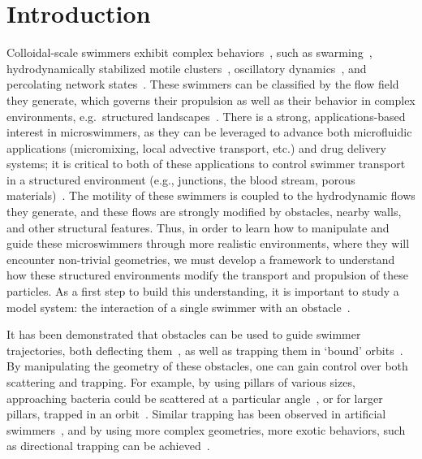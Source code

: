 \documentclass[12pt]{article}
\begin{document}
\section*{Introduction}

Colloidal-scale swimmers exhibit complex behaviors~\cite{elgeti2015physics,abbott2016active}, such as swarming~\cite{karani2019tuning}, hydro\-dy\-nam\-ically stabilized motile clusters~\cite{driscoll2017unstable}, oscillatory dynamics~\cite{keber2014topology}, and percolating network states~\cite{prymidis2015self}. 
These swimmers can be classified by the flow field they generate, which governs their propulsion as well as their behavior in complex environments, e.g.\ structured landscapes~\cite{bechinger2016active,kos2018elementary,morin2017distortion}.
There is a strong, applications-based interest in microswimmers, as they can be leveraged to advance both microfluidic applications (micromixing, local advective transport, etc.) and drug delivery systems; it is critical to both of these applications to control swimmer transport in a structured environment (e.g., junctions, the blood stream, porous materials)~\cite{tierno2021transport,martinezcalvo2021active}. The motility of these swimmers is coupled to the hydrodynamic flows they generate, and these flows are strongly modified by obstacles, nearby walls, and other structural features.  Thus, in order to learn how to manipulate and guide these microswimmers through more realistic environments, where they will encounter non-trivial geometries, we must develop a framework to understand how these structured environments modify the transport and propulsion of these particles. As a first step to build this understanding, it is important to study a model system: the interaction of a single swimmer with an obstacle~\cite{bechinger2016active,spagnolie2015geometric,takagi2014hydrodynamic,simmchen2016topographical,wykes2017guiding,sipos2015hydrodynamic,das2019colloidal,hoeger2021steric,chaithanya2021wall,Tahaka2022}.

It has been demonstrated that obstacles can be used to guide swimmer trajectories, both deflecting them~\cite{hoeger2021steric}, as well as trapping them in `bound' orbits~\cite{takagi2014hydrodynamic,simmchen2016topographical,wykes2017guiding,Tahaka2022,ketzetzi2022activity}.  By manipulating the geometry of these obstacles, one can gain control over both scattering and trapping.  For example, by using pillars of various sizes, approaching bacteria could be scattered at a particular angle~\cite{hoeger2021steric}, or for larger pillars, trapped in an orbit~\cite{sipos2015hydrodynamic,Tahaka2022}.  Similar trapping has been observed in artificial swimmers~\cite{takagi2014hydrodynamic,simmchen2016topographical,ketzetzi2022activity}, and by using more complex geometries, more exotic behaviors, such as directional trapping can be achieved~\cite{wykes2017guiding}. 
\end{document}
